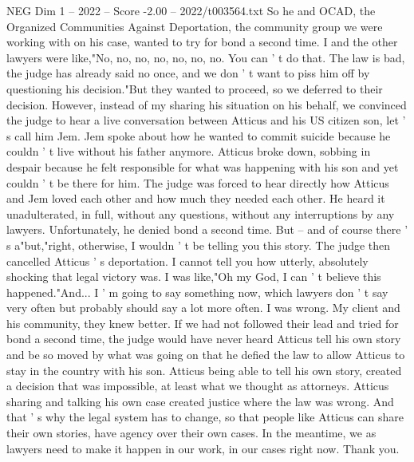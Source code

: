 \begin{textsample}{NEG Dim 1 – 2022 – Score -2.00 – 2022/t003564.txt}
So he and OCAD, the Organized Communities Against Deportation, the community group we were working with on his case, wanted to try for bond a second time.
I and the other lawyers were like,"No, no, no, no, no, no, no.
You can ' t do that.
The law is bad, the judge has already said no once, and we don ' t want to piss him off by questioning his decision."But they wanted to proceed, so we deferred to their decision.
However, instead of my sharing his situation on his behalf, we convinced the judge to hear a live conversation between Atticus and his US citizen son, let ' s call him Jem.
Jem spoke about how he wanted to commit suicide because he couldn ' t live without his father anymore.
Atticus broke down, sobbing in despair because he felt responsible for what was happening with his son and yet couldn ' t be there for him.
The judge was forced to hear directly how Atticus and Jem loved each other and how much they needed each other.
He heard it unadulterated, in full, without any questions, without any interruptions by any lawyers.
Unfortunately, he denied bond a second time.
But -- and of course there ' s a"but,"right, otherwise, I wouldn ' t be telling you this story.
The judge then cancelled Atticus ' s deportation.
I cannot tell you how utterly, absolutely shocking that legal victory was.
I was like,"Oh my God, I can ' t believe this happened."And...
I ' m going to say something now, which lawyers don ' t say very often but probably should say a lot more often.
I was wrong.
My client and his community, they knew better.
If we had not followed their lead and tried for bond a second time, the judge would have never heard Atticus tell his own story and be so moved by what was going on that he defied the law to allow Atticus to stay in the country with his son.
Atticus being able to tell his own story, created a decision that was impossible, at least what we thought as attorneys.
Atticus sharing and talking his own case created justice where the law was wrong.
And that ' s why the legal system has to change, so that people like Atticus can share their own stories, have agency over their own cases.
In the meantime, we as lawyers need to make it happen in our work, in our cases right now.
Thank you.

\end{textsample}
